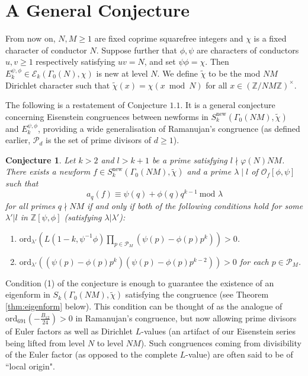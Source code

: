 \documentclass{amsart}
\theoremstyle{plain}
\newtheorem{conj}[theorem]{Conjecture}
\theoremstyle{definition}
\begin{document}
\section{A General Conjecture}
\label{section:conj}
From now on, $N, M\geq 1$ are fixed coprime squarefree integers and $\chi$ is a fixed character of conductor $N$. Suppose further that $\phi, \psi$ are characters of conductors $u, v\geq 1$ respectively satisfying $uv=N$, and set $\psi \phi = \chi$. Then $E_k^{\psi,\phi}\in \mathcal{E}_k(\Gamma_0(N),\chi)$ is new at level $N$. We define $\tilde{\chi}$ to be the mod $NM$ Dirichlet character such that $\tilde{\chi}(x) = \chi(x \bmod N)$ for all $x\in(\mathbb{Z}/NM\mathbb{Z})^{\times}$.

The following is a restatement of Conjecture $1.1$. It is a general conjecture concerning Eisenstein congruences between newforms in $S_k^{\text{new}}(\Gamma_0(NM),\tilde{\chi})$ and $E_k^{\psi,\phi}$, providing a wide generalisation of Ramanujan's congruence (as defined earlier, $\mathcal{P}_d$ is the set of prime divisors of $d\geq 1$).

\begin{conj}
\label{conj:general}
Let $k > 2$ and $l>k+1$ be a prime satisfying $l \nmid \varphi(N)NM$. There exists a newform $f \in S_k^{\text{new}}(\Gamma_0(NM), \tilde{\chi})$ and a prime $\lambda\mid l$ of $\mathcal{O}_f[\phi,\psi]$ such that 
\begin{equation*}
    a_q(f) \equiv \psi(q)+\phi(q)q^{k-1} \ \text{mod } \lambda
\end{equation*}
for all primes $q\nmid NM$ if and only if both of the following conditions hold for some $\lambda'|l$ in $\mathbb{Z}[\psi,\phi]$ (satisfying $\lambda|\lambda'$):
\begin{enumerate}
\item $\text{ord}_{\lambda'}(L(1-k, \psi^{-1}\phi) \prod_{p \in \mathcal{P}_M} (\psi(p) - \phi(p)p^k)) > 0$.
\item $\text{ord}_{\lambda'}((\psi(p)-\phi(p)p^k)(\psi(p)-\phi(p)p^{k-2}))>0$ for each $p \in \mathcal{P}_M$.
\end{enumerate}
\end{conj} 

Condition (1) of the conjecture is enough to guarantee the existence of an eigenform in $S_k(\Gamma_0(NM),\tilde{\chi})$ satisfying the congruence (see Theorem \ref{thm:eigenform} below). This condition can be thought of as the analogue of $\text{ord}_{691}\left(-\frac{B_{12}}{24}\right)>0$ in Ramanujan's congruence, but now allowing prime divisors of Euler factors as well as Dirichlet $L$-values (an artifact of our Eisenstein series being lifted from level $N$ to level $NM$). Such congruences coming from divisibility of the Euler factor (as opposed to the complete $L$-value) are often said to be of ``local origin".
\end{document}
